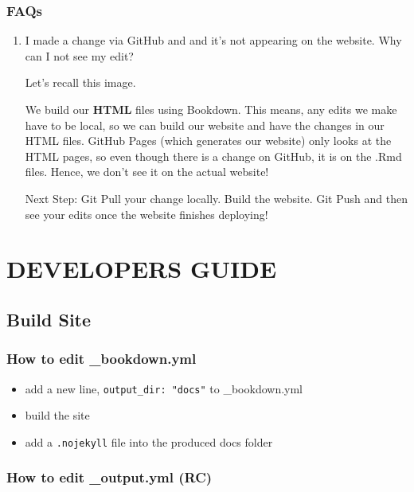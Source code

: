 \documentclass[
]{book}
\providecommand{\tightlist}{%
  \setlength{\itemsep}{0pt}\setlength{\parskip}{0pt}}
\theoremstyle{definition}
\theoremstyle{definition}
\theoremstyle{definition}
\theoremstyle{definition}
\theoremstyle{remark}
\begin{document}
\section{FAQs}\label{faqs}

\begin{enumerate}
\def\labelenumi{\arabic{enumi}.}
\item
  I made a change via GitHub and and it's not appearing on the website. Why can I not see my edit?

  Let's recall this image.

  We build our \textbf{HTML} files using Bookdown. This means, any edits we make have to be local, so we can build our website and have the changes in our HTML files. GitHub Pages (which generates our website) only looks at the HTML pages, so even though there is a change on GitHub, it is on the .Rmd files. Hence, we don't see it on the actual website!

  Next Step: Git Pull your change locally. Build the website. Git Push and then see your edits once the website finishes deploying!
\end{enumerate}

\part{DEVELOPERS GUIDE}\label{part-developers-guide}

\chapter{Build Site}\label{build-site}

\section{How to edit \_bookdown.yml}\label{how-to-edit-_bookdown.yml}

\begin{itemize}
\tightlist
\item
  add a new line, \texttt{output\_dir:\ "docs"} to \_bookdown.yml
\item
  build the site
\item
  add a \texttt{.nojekyll} file into the produced docs folder
\end{itemize}

\section{How to edit \_output.yml (RC)}\label{how-to-edit-_output.yml-rc}
\end{document}
